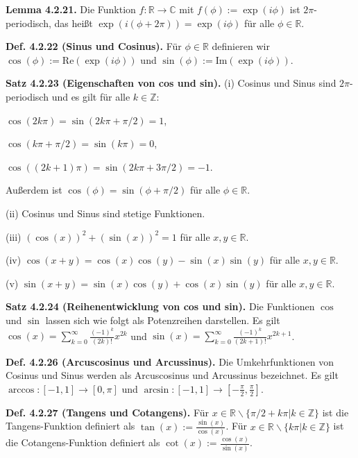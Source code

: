 \textbf{Lemma 4.2.21.} Die Funktion $f:\mathbb R \rightarrow \mathbb C$ mit $f(\phi) := \exp (i\phi)$ ist $2\pi$-periodisch, das heißt $\exp (i(\phi +2\pi)) = \exp(i\phi)$ für alle $\phi \in \mathbb R$.

\textbf{Def. 4.2.22 (Sinus und Cosinus).} Für $\phi \in \mathbb R$ definieren wir $\cos(\phi) := \text{Re}(\exp(i\phi))$ und $\sin(\phi) := \text{Im}(\exp(i\phi))$.

\textbf{Satz 4.2.23 (Eigenschaften von cos und sin).} (i) Cosinus und Sinus sind $2\pi$-periodisch und es gilt für alle $k \in \mathbb Z$:

$\cos (2k\pi) = \sin (2k\pi + \pi / 2)= 1$,

$\cos (k\pi+ \pi /2) = \sin(k\pi) = 0$,

$\cos ((2k+1)\pi) = \sin (2k\pi+3\pi/2) = -1$.

Außerdem ist $\cos (\phi) = \sin(\phi + \pi /2)$ für alle $\phi \in \mathbb R$.

(ii) Cosinus und Sinus sind  stetige Funktionen.

(iii) $(\cos(x))^2 + (\sin (x))^2 = 1$ für alle $x,y \in \mathbb R$.

(iv) $\cos (x+y) = \cos (x) \cos (y) - \sin (x) \sin (y)$ für alle $x,y \in \mathbb R$.

(v) $\sin (x+y) = \sin (x) \cos(y) + \cos (x) \sin (y)$ für alle $x,y \in \mathbb R$.

\textbf{Satz 4.2.24 (Reihenentwicklung von cos und sin).} Die Funktionen $\cos$ und $\sin$ lassen sich wie folgt als Potenzreihen darstellen. Es gilt $\cos (x) = \sum_{k=0}^\infty \frac{(-1)^k}{(2k)!}x^{2k}$ und $\sin (x) = \sum_{k=0}^\infty \frac{(-1)^k}{(2k+1)!}x^{2k+1}$.

\textbf{Def. 4.2.26 (Arcuscosinus und Arcussinus).} Die Umkehrfunktionen von Cosinus und Sinus werden als Arcuscosinus und Arcussinus bezeichnet. Es gilt $\arccos\colon[-1,1]\to[0,\pi]$ und $\arcsin\colon[-1,1]\to \left[-\frac{\pi}{2},\frac{\pi}{2} \right]$.  

\textbf{Def. 4.2.27 (Tangens und Cotangens).} Für $x\in \mathbb R \backslash \{ \pi /2 + k \pi \vert k \in \mathbb Z \}$ ist die Tangens-Funktion definiert als $\tan(x) := \frac{\sin(x)}{\cos(x)}$. Für $x \in \mathbb R \backslash \{ k\pi \vert k \in \mathbb Z \}$ ist die Cotangens-Funktion definiert als $\cot(x) := \frac{\cos(x)}{\sin(x)}$.

